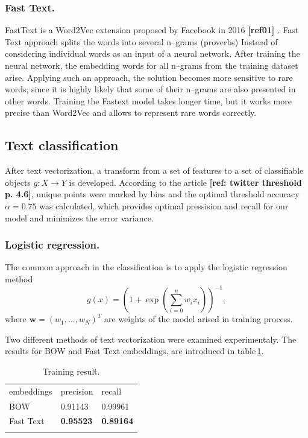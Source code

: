 \documentclass[12pt]{jpconf}
\begin{document}
\subsubsection*{Fast Text.}
FastText is a Word2Vec extension proposed by Facebook in 2016 {\bf\color{red}[ref01] \cite{Ref01}}. Fast Text approach splits the words into several n--grams (proverbs) Instead of considering individual words as an input of a neural network. After training the neural network, the embedding words for all n--grams from the training dataset arise.
Applying such an approach, the solution becomes more sensitive to rare words, since it is highly likely that some of their n--grams are also presented in other words. Training the Fastext model takes longer time, but it works more precise than Word2Vec and allows to  represent rare words correctly.

\subsection{Text classification}
After text vectorization, a transform from a set of features to a set of classifiable objects $g: X \rightarrow Y$ is developed.
According to the article {\bf\color{red}[ref: twitter threshold p. 4.6]\cite{Ref02}}, unique points were marked by bins and the optimal threshold accuracy $\alpha = 0.75$ was calculated, which provides optimal pressision and recall for our model and minimizes the error variance.

\subsubsection*{Logistic regression.}
The common approach in the classification is to apply the logistic regression method
$$
g(x) = \left(1 + \exp{ \left( \sum_{i=0}^n w_i x_i  \right) }\right)^{-1},
$$
where $\mathbf{w}=(w_1,\ldots, w_N)^T$ are weights of the model arised in training process.

Two different methods of text vectorization were examined experimentaly.
The results for BOW and Fast Text embeddings, are introduced in table\,\ref{tbl:01}.

\begin{table}[h!]
	\centering
	\caption{\label{tbl:01}Training result.}
	\begin{center}
		\begin{tabular}{lll}
			\br
			embeddings & precision & recall \\
			\mr
			BOW & 0.91143 & 0.99961 \\ \hline
			Fast Text & \bf 0.95523 & \bf 0.89164 \\ 
			\br
		\end{tabular}
	\end{center}
\end{table}
\end{document}
